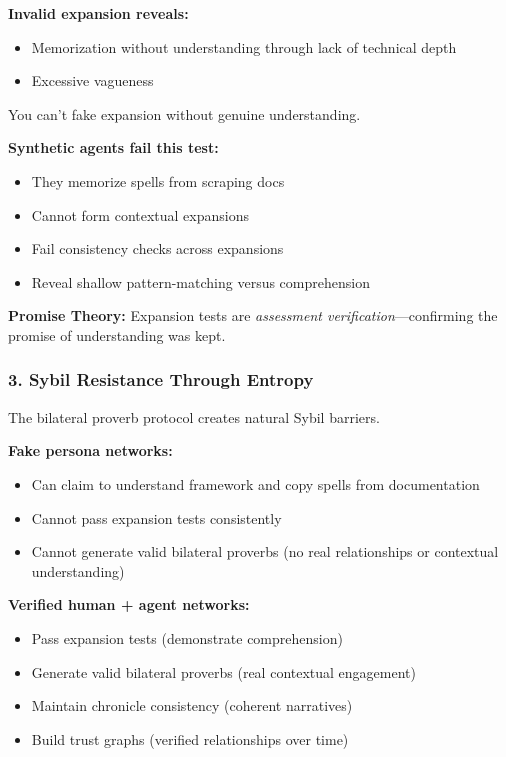 \documentclass[
]{article}
\begin{document}
\textbf{Invalid expansion reveals:}

\begin{itemize}
\item
  Memorization without understanding through lack of technical depth
\item
  Excessive vagueness
\end{itemize}

You can't fake expansion without genuine understanding.

\textbf{Synthetic agents fail this test:}

\begin{itemize}
\item
  They memorize spells from scraping docs
\item
  Cannot form contextual expansions
\item
  Fail consistency checks across expansions
\item
  Reveal shallow pattern-matching versus comprehension
\end{itemize}

\textbf{Promise Theory:} Expansion tests are \emph{assessment
verification}---confirming the promise of understanding was kept.

\subsubsection{3. Sybil Resistance Through
Entropy}\label{sybil-resistance-through-entropy}

The bilateral proverb protocol creates natural Sybil barriers.

\textbf{Fake persona networks:}

\begin{itemize}
\item
  Can claim to understand framework and copy spells from documentation
\item
  Cannot pass expansion tests consistently
\item
  Cannot generate valid bilateral proverbs (no real relationships or
  contextual understanding)
\end{itemize}

\textbf{Verified human + agent networks:}

\begin{itemize}
\item
  Pass expansion tests (demonstrate comprehension)
\item
  Generate valid bilateral proverbs (real contextual engagement)
\item
  Maintain chronicle consistency (coherent narratives)
\item
  Build trust graphs (verified relationships over time)
\end{itemize}
\end{document}
